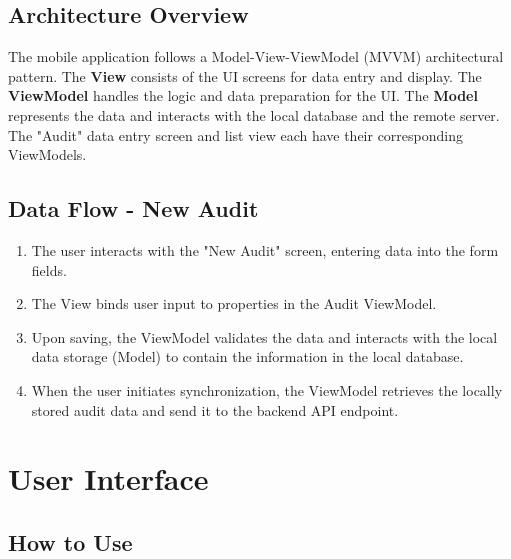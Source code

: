 \documentclass[12pt]{article}
\begin{document}
\subsection{Architecture Overview}


The mobile application follows a Model-View-ViewModel (MVVM) architectural pattern. The \textbf{View} consists of the UI screens for data entry and display. The \textbf{ViewModel} handles the logic and data preparation for the UI. The \textbf{Model} represents the data and interacts with the local database and the remote server. The "Audit" data entry screen and list view each have their corresponding ViewModels.

\subsection{Data Flow - New Audit}

\begin{enumerate}
    \item The user interacts with the "New Audit" screen, entering data into the form fields.
    \item The View binds user input to properties in the Audit ViewModel.
    \item Upon saving, the ViewModel validates the data and interacts with the local data storage (Model) to contain the information in the local database.
    \item When the user initiates synchronization, the ViewModel retrieves the locally stored audit data and send it to the backend API endpoint.
\end{enumerate}

\newpage

\section{User Interface}
\subsection{How to Use}
\end{document}
